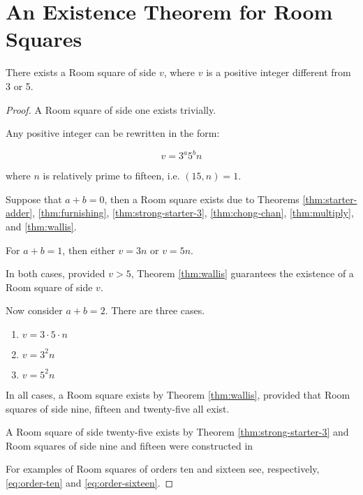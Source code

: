 \chapter{An Existence Theorem for Room Squares}
\label{ch:existence-theorem}

\begin{theorem}
There exists a Room square of side $v$, where $v$ is a positive integer different from 3 or 5.
\end{theorem}

\begin{proof}
A Room square of side one exists trivially.

Any positive integer can be rewritten in the form:

\begin{equation}
v = 3^{a}5^{b}n
\end{equation}

where $n$ is relatively prime to fifteen, i.e.  $(15, n) = 1$.

Suppose that $a + b = 0$, then a Room square exists due to Theorems
\ref{thm:starter-adder},
\ref{thm:furnishing},
\ref{thm:strong-starter-3},
\ref{thm:chong-chan},
\ref{thm:multiply},
and
\ref{thm:wallis}.

For $a + b = 1$, then either $v = 3n$ or $v = 5n$.

In both cases, provided $v > 5$, Theorem \ref{thm:wallis} guarantees the existence of a Room square of side $v$.

Now consider $a + b = 2$.
There are three cases.

\begin{enumerate}
  \item{$v = 3\cdot 5\cdot n$}
  \item{$v = 3^{2}n$}
  \item{$v = 5^{2}n$}
\end{enumerate}

In all cases, a Room square exists by Theorem \ref{thm:wallis}, provided that Room squares of side nine, fifteen and twenty-five all exist.

A Room square of side twenty-five exists by Theorem \ref{thm:strong-starter-3} and Room squares of side nine and fifteen were constructed in
\cite{mullinFurnishingRoomSquares1969}

For examples of Room squares of orders ten and sixteen see, respectively, \eqref{eq:order-ten} and \eqref{eq:order-sixteen}.


\end{proof}
